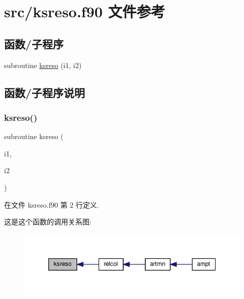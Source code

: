 \hypertarget{ksreso_8f90}{}\section{src/ksreso.f90 文件参考}
\label{ksreso_8f90}
\subsection*{函数/子程序}
\begin{DoxyCompactItemize}
\item 
subroutine \mbox{\hyperlink{ksreso_8f90_a8d0726dd6c9eafb2594b7b4a587ee5a2}{ksreso}} (i1, i2)
\end{DoxyCompactItemize}


\subsection{函数/子程序说明}
\mbox{\label{ksreso_8f90_a8d0726dd6c9eafb2594b7b4a587ee5a2}} 
\subsubsection{\texorpdfstring{ksreso()}{ksreso()}}
{\footnotesize\ttfamily subroutine ksreso (\begin{DoxyParamCaption}\item[{}]{i1,  }\item[{}]{i2 }\end{DoxyParamCaption})}



在文件 ksreso.\+f90 第 2 行定义.

这是这个函数的调用关系图\+:
\nopagebreak
\begin{figure}[H]
\begin{center}
\leavevmode
\includegraphics[width=350pt]{ksreso_8f90_a8d0726dd6c9eafb2594b7b4a587ee5a2_icgraph}
\end{center}
\end{figure}
